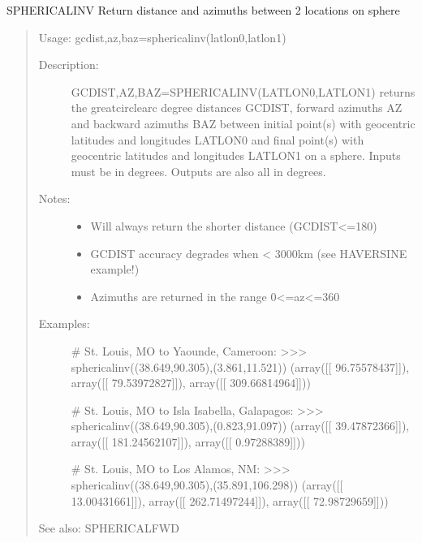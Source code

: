 \documentclass[letterpaper,10pt,english]{sphinxmanual}
\begin{document}

\begin{fulllineitems}
\label{\detokenize{infrapy.utils:infrapy.utils.latlon.sphericalinv}}
SPHERICALINV    Return distance and azimuths between 2 locations on sphere
\begin{quote}

Usage:    gcdist,az,baz=sphericalinv(latlon0,latlon1)
\begin{description}
\item[{Description:}] \leavevmode
GCDIST,AZ,BAZ=SPHERICALINV(LATLON0,LATLON1) returns the
great\sphinxhyphen{}circle\sphinxhyphen{}arc degree distances GCDIST, forward azimuths AZ and
backward azimuths BAZ between initial point(s) with geocentric
latitudes and longitudes LATLON0 and final point(s) with geocentric
latitudes and longitudes LATLON1 on a sphere.  Inputs must be in
degrees.  Outputs are also all in degrees.

\item[{Notes:}] \leavevmode\begin{itemize}
\item {} 
Will always return the shorter distance (GCDIST\textless{}=180)

\item {} 
GCDIST accuracy degrades when \textless{} 3000km (see HAVERSINE example!)

\item {} 
Azimuths are returned in the range 0\textless{}=az\textless{}=360

\end{itemize}

\item[{Examples:}] \leavevmode
\# St. Louis, MO to Yaounde, Cameroon:
\textgreater{}\textgreater{}\textgreater{} sphericalinv((38.649,\sphinxhyphen{}90.305),(3.861,11.521))
(array({[}{[} 96.75578437{]}{]}), array({[}{[} 79.53972827{]}{]}), array({[}{[} 309.66814964{]}{]}))

\# St. Louis, MO to Isla Isabella, Galapagos:
\textgreater{}\textgreater{}\textgreater{} sphericalinv((38.649,\sphinxhyphen{}90.305),(\sphinxhyphen{}0.823,\sphinxhyphen{}91.097))
(array({[}{[} 39.47872366{]}{]}), array({[}{[} 181.24562107{]}{]}), array({[}{[} 0.97288389{]}{]}))

\# St. Louis, MO to Los Alamos, NM:
\textgreater{}\textgreater{}\textgreater{} sphericalinv((38.649,\sphinxhyphen{}90.305),(35.891,\sphinxhyphen{}106.298))
(array({[}{[} 13.00431661{]}{]}), array({[}{[} 262.71497244{]}{]}), array({[}{[} 72.98729659{]}{]}))

\end{description}

See also: SPHERICALFWD
\end{quote}

\end{fulllineitems}
\end{document}
